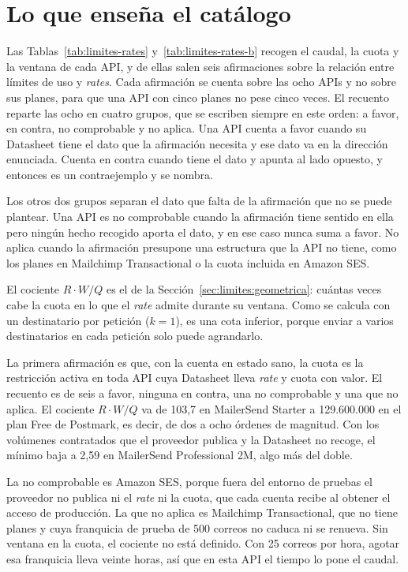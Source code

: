 \section{Lo que enseña el catálogo}
\label{sec:limites:catalogo}

Las Tablas~\ref{tab:limites-rates} y~\ref{tab:limites-rates-b} recogen el caudal, la cuota y la ventana de cada API, y de ellas salen seis afirmaciones sobre la relación entre límites de uso y \textit{rates}.
Cada afirmación se cuenta sobre las ocho APIs y no sobre sus planes, para que una API con cinco planes no pese cinco veces.
El recuento reparte las ocho en cuatro grupos, que se escriben siempre en este orden: a favor, en contra, no comprobable y no aplica.
Una API cuenta a favor cuando su Datasheet tiene el dato que la afirmación necesita y ese dato va en la dirección enunciada.
Cuenta en contra cuando tiene el dato y apunta al lado opuesto, y entonces es un contraejemplo y se nombra.

Los otros dos grupos separan el dato que falta de la afirmación que no se puede plantear.
Una API es no comprobable cuando la afirmación tiene sentido en ella pero ningún hecho recogido aporta el dato, y en ese caso nunca suma a favor.
No aplica cuando la afirmación presupone una estructura que la API no tiene, como los planes en Mailchimp Transactional o la cuota incluida en Amazon SES.

El cociente $R \cdot W / Q$ es el de la Sección~\ref{sec:limites:geometrica}: cuántas veces cabe la cuota en lo que el \textit{rate} admite durante su ventana.
Como se calcula con un destinatario por petición ($k = 1$), es una cota inferior, porque enviar a varios destinatarios en cada petición solo puede agrandarlo.

La primera afirmación es que, con la cuenta en estado sano, la cuota es la restricción activa en toda API cuya Datasheet lleva \textit{rate} y cuota con valor.
El recuento es de seis a favor, ninguna en contra, una no comprobable y una que no aplica.
El cociente $R \cdot W / Q$ va de 103,7 en MailerSend Starter a 129.600.000 en el plan Free de Postmark, es decir, de dos a ocho órdenes de magnitud.
Con los volúmenes contratados que el proveedor publica y la Datasheet no recoge, el mínimo baja a 2,59 en MailerSend Professional 2M, algo más del doble.

La no comprobable es Amazon SES, porque fuera del entorno de pruebas el proveedor no publica ni el \textit{rate} ni la cuota, que cada cuenta recibe al obtener el acceso de producción.
La que no aplica es Mailchimp Transactional, que no tiene planes y cuya franquicia de prueba de 500 correos no caduca ni se renueva.
Sin ventana en la cuota, el cociente no está definido.
Con 25 correos por hora, agotar esa franquicia lleva veinte horas, así que en esta API el tiempo lo pone el caudal.

